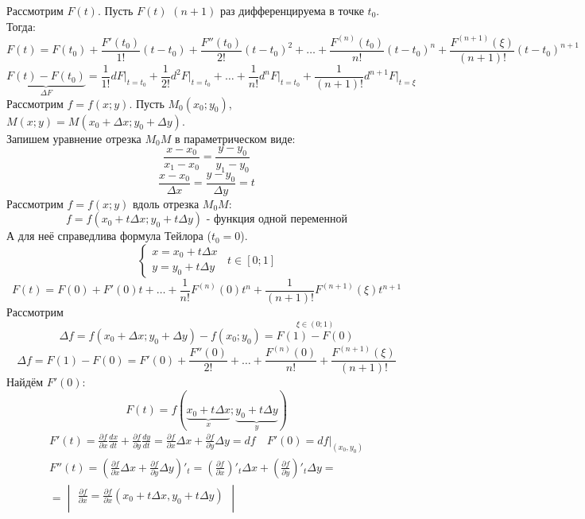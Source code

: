\documentclass[12pt]{article}
\begin{document}
    \begin{adjustwidth}{1.5em}{1.5em}
        Рассмотрим $F(t)$. Пусть $F(t)$ $(n + 1)$ раз дифференцируема в точке $t_0$. Тогда:
        \[ F(t) = F(t_0) + \frac{F'(t_0)}{1!}(t-t_0) + \frac{F''(t_0)}{2!}(t-t_0)^2 + \dots + \frac{F^{(n)}(t_0)}{n!}(t-t_0)^n + \frac{F^{(n+1)}(\xi)}{(n+1)!}(t-t_0)^{n+1} \]
        \[ \underbrace{F(t) - F(t_0)}_{\Delta F} = \frac{1}{1!}dF\Big|_{t=t_0} + \frac{1}{2!}d^2F\Big|_{t=t_0} + \dots + \frac{1}{n!}d^nF\Big|_{t=t_0} + \frac{1}{(n+1)!}d^{n+1}F\Big|_{t=\xi} \]
        Рассмотрим $f = f(x; y)$. Пусть $M_0(x_0; y_0)$, $M(x; y) = M(x_0 + \Delta x; y_0 + \Delta y)$.\\
        Запишем уравнение отрезка $M_0M$ в параметрическом виде:
        \[ \frac{x - x_0}{x_1 - x_0} = \frac{y - y_0}{y_1 - y_0} \]
        \[ \frac{x - x_0}{\Delta x} = \frac{y - y_0}{\Delta y} = t \]
        Рассмотрим $f = f(x; y)$ вдоль отрезка $M_0M$:
        \[ f = f(x_0 + t \Delta x; y_0 + t \Delta y) \text{ - функция одной переменной} \]
        А для неё справедлива формула Тейлора ($t_0 = 0$).
        \[ \begin{cases}
            x = x_0 + t \Delta x\\
            y = y_0 + t \Delta y
        \end{cases}\,\,\, t \in [0; 1] \]
        \[ F(t) = F(0) + F'(0)t + \dots + \frac{1}{n!}F^{(n)}(0)t^n + \frac{1}{(n+1)!}F^{(n+1)}(\xi)t^{n+1} \]
        Рассмотрим
        \[ \Delta f = f(x_0 + \Delta x; y_0 + \Delta y) - f(x_0; y_0) = \overset{\xi \in (0; 1)}{F(1) - F(0)} \]
        \[ \Delta f = F(1) - F(0) = F'(0) + \frac{F''(0)}{2!} + \dots + \frac{F^{(n)}(0)}{n!} + \frac{F^{(n+1)}(\xi)}{(n+1)!} \]
        Найдём $F'(0)$:
        \[ F(t) = f(\underbrace{x_0 + t\Delta x}_{x}; \underbrace{y_0 + t\Delta y}_{y}) \]
        \begin{gather*}
            F'(t)=\frac{\partial f}{\partial x} \frac{d x}{d t}+\frac{\partial f}{\partial y} \frac{d y}{d t}=\frac{\partial f}{\partial x} \Delta x+\frac{\partial f}{\partial y} \Delta y=d f \quad F'(0)=d f \Big|_{(x_0, y_0)} \\
            F''(t)=\left(\frac{\partial f}{\partial x} \Delta x+\frac{\partial f}{\partial y} \Delta y\right)'_t =\left(\frac{\partial f}{\partial x}\right)'_t \Delta x+\left(\frac{\partial f}{\partial y}\right)'_t \Delta y= \\
            =\begin{vmatrix}
                \frac{\partial f}{\partial x}=\frac{\partial f}{\partial x}\left(x_0+t\Delta x, y_0+t \Delta y\right)\\

\end{vmatrix}
\end{gather*}
\end{adjustwidth}
\end{document}

